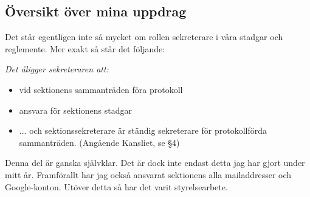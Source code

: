 \documentclass[../testamente_sekreterare_21-22.tex]{subfiles}
\begin{document}
\subsection{Översikt över mina uppdrag}
Det står egentligen inte så mycket om rollen sekreterare i våra stadgar och reglemente. Mer exakt så står det följande:
\begin{displayquote}[Stadgarna]
  \itshape
  Det åligger sekreteraren att:
  \begin{itemize}
    \item vid sektionens sammanträden föra protokoll
    \item ansvara för sektionens stadgar
  \end{itemize}
\end{displayquote}
\begin{displayquote}[Reglementet]
  \itshape
  \begin{itemize}
    \item ... och sektionssekreterare är ständig sekreterare
    för protokollförda sammanträden. (Angående Kansliet, se §4)
  \end{itemize}
\end{displayquote}

Denna del är ganska självklar. Det är dock inte endast detta jag har gjort under mitt år. Framförallt har jag också ansvarat sektionens alla mailaddresser och Google-konton. Utöver detta så har det varit  styrelsearbete.
\end{document}
